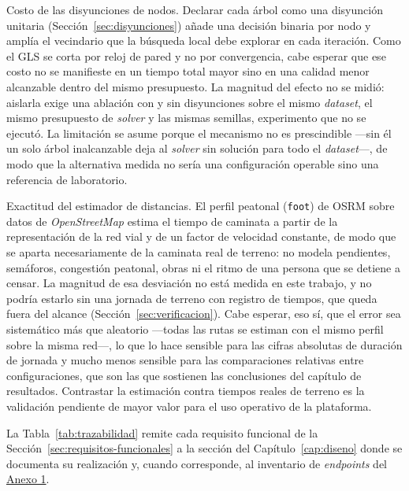 \begin{enumerate}
Costo de las disyunciones de nodos.
Declarar cada árbol como una disyunción unitaria (Sección~\ref{sec:disyunciones})
añade una decisión binaria por nodo y amplía el vecindario que la búsqueda local
debe explorar en cada iteración. Como el GLS se corta por reloj de pared y no por
convergencia, cabe esperar que ese costo no se manifieste en un tiempo total mayor
sino en una calidad menor alcanzable dentro del mismo presupuesto. La magnitud del
efecto no se midió: aislarla exige una ablación con y sin disyunciones sobre el mismo
\textit{dataset}, el mismo presupuesto de \textit{solver} y las mismas semillas,
experimento que no se ejecutó. La limitación se asume porque el mecanismo no es
prescindible ---sin él un solo árbol inalcanzable deja al \textit{solver} sin solución
para todo el \textit{dataset}---, de modo que la alternativa medida no sería una
configuración operable sino una referencia de laboratorio.

Exactitud del estimador de distancias.
El perfil peatonal (\texttt{foot}) de OSRM sobre datos de \textit{OpenStreetMap}
estima el tiempo de caminata a partir de la representación de la red vial y de un
factor de velocidad constante, de modo que se aparta necesariamente de la caminata
real de terreno: no modela pendientes, semáforos, congestión peatonal, obras ni el
ritmo de una persona que se detiene a censar. La magnitud de esa desviación no está
medida en este trabajo, y no podría estarlo sin una jornada de terreno con registro de
tiempos, que queda fuera del alcance (Sección~\ref{sec:verificacion}). Cabe esperar,
eso sí, que el error sea sistemático más que aleatorio ---todas las rutas se estiman
con el mismo perfil sobre la misma red---, lo que lo hace sensible para las cifras
absolutas de duración de jornada y mucho menos sensible para las comparaciones
relativas entre configuraciones, que son las que sostienen las conclusiones del
capítulo de resultados. Contrastar la estimación contra tiempos reales de terreno es
la validación pendiente de mayor valor para el uso operativo de la plataforma.

\end{enumerate}

\label{anx:trazabilidad}

La Tabla~\ref{tab:trazabilidad} remite cada requisito funcional de la
Sección~\ref{sec:requisitos-funcionales} a la sección del Capítulo~\ref{cap:diseno}
donde se documenta su realización y, cuando corresponde, al inventario de
\textit{endpoints} del \hyperref[anx:api]{Anexo 1}.

